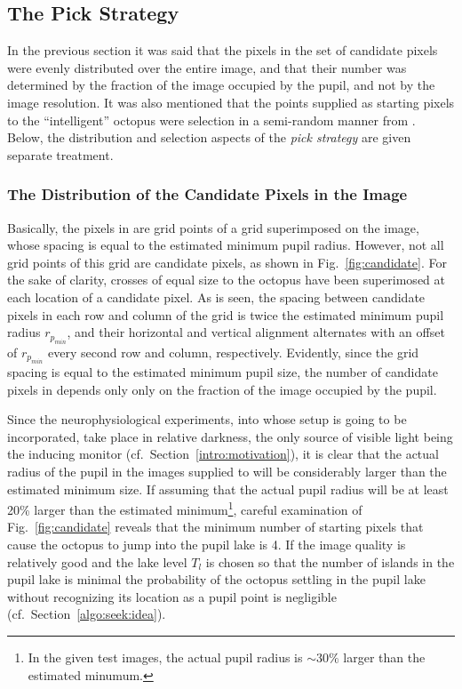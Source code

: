 \subsection{The Pick Strategy}
\label{algo:seek:strategy}

In the previous section it was said that the pixels in the set {\SS}
of candidate pixels were evenly distributed over the entire image, and
that their number was determined by the fraction of the image occupied
by the pupil, and not by the image resolution.  It was also mentioned
that the points supplied as starting pixels to the ``intelligent''
octopus were selection in a semi-random manner from {\SS}.  Below, the
distribution and selection aspects of the {\em pick strategy\/} are
given separate treatment.

\subsubsection{The Distribution of the Candidate Pixels in the Image}


Basically, the pixels in {\SS} are grid points of a grid superimposed
on the image, whose spacing is equal to the estimated minimum pupil
radius.  However, not all grid points of this grid are candidate
pixels, as shown in Fig.~\ref{fig:candidate}.  For the sake of
clarity, crosses of equal size to the octopus have been superimosed at
each location of a candidate pixel.  As is seen, the spacing between
candidate pixels in each row and column of the grid is twice the
estimated minimum pupil radius $r_{p_{min}}$, and their horizontal and
vertical alignment alternates with an offset of $r_{p_{min}}$ every
second row and column, respectively.  Evidently, since the grid
spacing is equal to the estimated minimum pupil size, the number of
candidate pixels in {\SS} depends only only on the fraction of the
image occupied by the pupil.

Since the neurophysiological experiments, into whose setup {\octopus}
is going to be incorporated, take place in relative darkness, the only
source of visible light being the inducing monitor (cf.\ 
Section~\ref{intro:motivation}), it is clear that the actual radius of
the pupil in the images supplied to {\octopus} will be considerably
larger than the estimated minimum size.  If assuming that the actual
pupil radius will be at least 20\% larger than the estimated
minimum\footnote{In the given test images, the actual pupil radius is
  $\sim 30\%$ larger than the estimated minumum.}, careful examination
of Fig.~\ref{fig:candidate} reveals that the minimum number of
starting pixels that cause the octopus to jump into the pupil lake is
4.  If the image quality is relatively good and the lake level $T_{l}$
is chosen so that the number of islands in the pupil lake is minimal
the probability of the octopus settling in the pupil lake without
recognizing its location as a pupil point is negligible (cf.\ 
Section~\ref{algo:seek:idea}).

